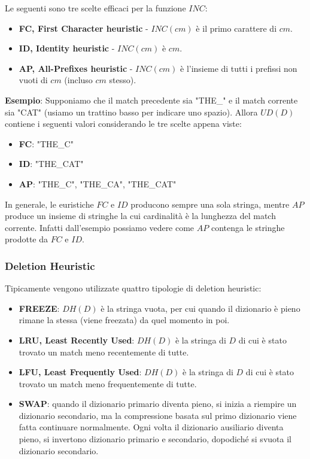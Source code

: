 \vspace{3mm}
Le seguenti sono tre scelte efficaci per la funzione \(INC\):
\begin{itemize}
    \item \textbf{FC, First Character heuristic} - \(INC(cm)\) è il primo carattere di \(cm\).
    \item \textbf{ID, Identity heuristic} - \(INC(cm)\) è \(cm\).
    \item \textbf{AP, All-Prefixes heuristic} - \(INC(cm)\) è l'insieme di tutti i prefissi non vuoti di \(cm\) (incluso \(cm\) stesso).
\end{itemize}

\textbf{Esempio}: Supponiamo che il match precedente sia "THE\_" e il match corrente sia "CAT" (usiamo un trattino basso per indicare uno spazio). Allora \(UD(D)\) contiene i seguenti valori considerando le tre scelte appena viste:
\begin{itemize}
    \item \textbf{FC}: {"THE\_C"}
    \item \textbf{ID}: {"THE\_CAT"}
    \item \textbf{AP}: {"THE\_C", "THE\_CA", "THE\_CAT"}
\end{itemize}
In generale, le euristiche \(FC\) e \(ID\) producono sempre una sola stringa, mentre \(AP\) produce un insieme di stringhe la cui cardinalità è la lunghezza del match corrente. Infatti dall'esempio possiamo vedere come \(AP\) contenga le stringhe prodotte da \(FC\) e \(ID\).

\subsubsection{Deletion Heuristic}
Tipicamente vengono utilizzate quattro tipologie di deletion heuristic:
\begin{itemize}
    \item \textbf{FREEZE}: \(DH(D)\) è la stringa vuota, per cui quando il dizionario è pieno rimane la stessa (viene freezata) da quel momento in poi.
    \item \textbf{LRU, Least Recently Used}: \(DH(D)\) è la stringa di \(D\) di cui è stato trovato un match meno recentemente di tutte.
    \item \textbf{LFU, Least Frequently Used}: \(DH(D)\) è la stringa di \(D\) di cui è stato trovato un match meno frequentemente di tutte.
    \item \textbf{SWAP}: quando il dizionario primario diventa pieno, si inizia a riempire un dizionario secondario, ma la compressione basata sul primo dizionario viene fatta continuare normalmente. Ogni volta il dizionario ausiliario diventa pieno, si invertono dizionario primario e secondario, dopodiché si svuota il dizionario secondario.
\end{itemize}

